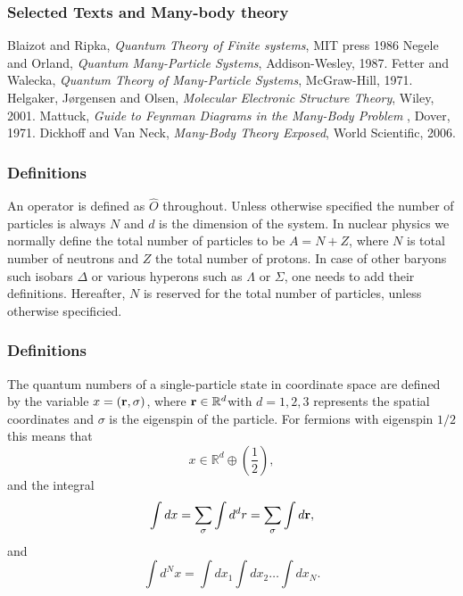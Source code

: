 \frame
{
  \frametitle<presentation>{Selected Texts and Many-body theory}
 \begin{small}
 {\scriptsize

  \beamertemplatebookbibitems

  \begin{thebibliography}{10}
    Blaizot and Ripka, {\em Quantum Theory of Finite systems}, MIT press 1986
    Negele and Orland, {\em Quantum Many-Particle Systems}, Addison-Wesley, 1987.
    Fetter and Walecka, {\em Quantum Theory of Many-Particle Systems}, McGraw-Hill, 1971.
    Helgaker, J\o rgensen and Olsen, {\em Molecular Electronic Structure Theory}, Wiley, 2001.
    Mattuck, {\em Guide to Feynman Diagrams in the Many-Body Problem }, Dover, 1971.
    Dickhoff and Van Neck, {\em Many-Body Theory Exposed}, World Scientific, 2006.

\end{thebibliography}
 }
 \end{small}
}




\frame
{
\frametitle{Definitions}
An operator is defined as $\hat{O}$ throughout. Unless otherwise
specified the number of particles is always $N$ and $d$ is the dimension of the 
system. 
In nuclear physics we normally define the total number of particles to be $A=N+Z$,
where $N$ is total number of neutrons and $Z$ the total number of protons. In case of other baryons such isobars $\Delta$ or
various hyperons such as $\Lambda$ or $\Sigma$, one needs to add their definitions.  
%
Hereafter, $N$ is reserved for the total number of particles, unless otherwise specificied.
}



\frame
{
\frametitle{Definitions}
The quantum numbers of a single-particle state in coordinate space are
defined by the variable $x=({\bf r},\sigma)$, where ${\bf r}\in {\mathbb{R}}^{d}$with $d=1,2,3$ represents the spatial coordinates and $\sigma$ is the eigenspin of the particle. For fermions with eigenspin $1/2$ this means that
\[
 x\in {\mathbb{R}}^{d}\oplus (\frac{1}{2}),
\]
and the integral
\[
\int dx = \sum_{\sigma}\int d^dr = \sum_{\sigma}\int d{\bf r},
\]
and
\[
\int d^Nx= \int dx_1\int dx_2\dots\int dx_N.
\]

}


